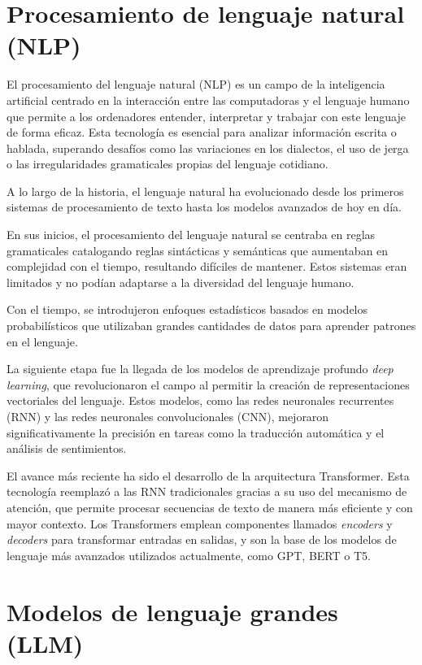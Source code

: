 

\section{Procesamiento de lenguaje natural (NLP)}

El procesamiento del lenguaje natural (NLP) es un campo de la inteligencia artificial centrado en 
la interacción entre las computadoras y el lenguaje humano que permite a los ordenadores entender, 
interpretar y trabajar con este lenguaje de forma eficaz. Esta tecnología es esencial para 
analizar información escrita o hablada, superando desafíos como las variaciones en los dialectos, 
el uso de jerga o las irregularidades gramaticales propias del lenguaje cotidiano.


A lo largo de la historia, el lenguaje natural ha evolucionado desde los primeros sistemas de 
procesamiento de texto hasta los modelos avanzados de hoy en día.

En sus inicios, el procesamiento del lenguaje natural se centraba en reglas gramaticales 
catalogando reglas sintácticas y semánticas que aumentaban en complejidad con el tiempo, 
resultando difíciles de mantener. Estos sistemas eran limitados y no podían adaptarse a la 
diversidad del lenguaje humano.

Con el tiempo, se introdujeron enfoques estadísticos basados en modelos probabilísticos que 
utilizaban grandes cantidades de datos para aprender patrones en el lenguaje. 

La siguiente etapa fue la llegada de los modelos de aprendizaje profundo \textit{deep learning}, 
que revolucionaron el campo al permitir la creación de representaciones vectoriales del lenguaje. 
Estos modelos, como las redes neuronales recurrentes (RNN) y las redes neuronales convolucionales 
(CNN), mejoraron significativamente la precisión en tareas como la traducción automática y el 
análisis de sentimientos.

El avance más reciente ha sido el desarrollo de la arquitectura Transformer. Esta tecnología 
reemplazó a las RNN tradicionales gracias a su uso del mecanismo de atención, que permite procesar
 secuencias de texto de manera más eficiente y con mayor contexto. Los Transformers emplean 
 componentes llamados \textit{encoders} y \textit{decoders} para transformar entradas en salidas, y 
 son la base de los modelos de lenguaje más avanzados utilizados actualmente, como GPT, BERT o T5.

\section{Modelos de lenguaje grandes (LLM)}




